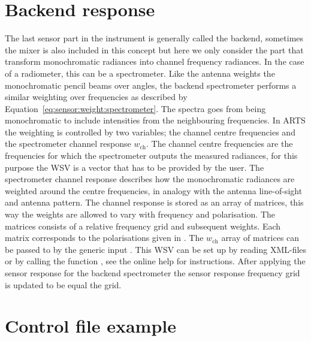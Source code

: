 \section{Backend response}
\label{sec:sensor:backend}
The last sensor part in the instrument is generally called the
backend, sometimes the mixer is also included in this concept but here
we only consider the part that transform monochromatic radiances into
channel frequency radiances. In the case of a radiometer, this can be
a spectrometer. Like the antenna weights the monochromatic pencil
beams over angles, the backend spectrometer performs a similar
weighting over frequencies as described by
Equation~\ref{eq:sensor:weight:spectrometer}. The spectra goes from
being monochromatic to include intensities from the neighbouring
frequencies.  In ARTS the weighting is controlled by two variables;
the channel centre frequencies  and the spectrometer
channel response $w_\mathrm{ch}$. The channel centre frequencies are
the frequencies for which the spectrometer outputs the measured
radiances, for this purpose the WSV  is a vector
that has to be provided by the user.  The spectrometer channel
response describes how the monochromatic radiances are weighted around
the centre frequencies, in analogy with the antenna line-of-sight and
antenna pattern. The channel response is stored as an array of
matrices, this way the weights are allowed to vary with frequency and
polarisation. The matrices consists of a relative frequency grid and
subsequent weights. Each matrix corresponds to the polarisations given
in . The $w_\mathrm{ch}$ array of matrices can be passed to
 by the generic input
. This WSV can be set up by reading
XML-files or by calling the function , see
the online help for instructions.  After applying the sensor response
for the backend spectrometer the sensor response frequency grid is
updated to be equal the  grid.
% 
% 


\section{Control file example}

